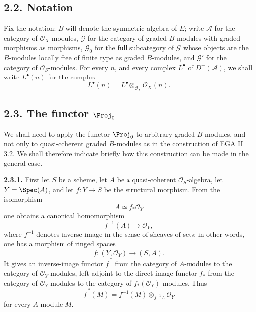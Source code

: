 \subsection*{2.2. Notation}
Fix the notation: \(B\) will denote the symmetric algebra of \(E\); write \(\mathcal A\) for the category of \(\mathcal O_X\)-modules, \(\mathcal G\) for the category of graded \(B\)-modules with graded morphisms as morphisms, \(\mathcal G_0\) for the full subcategory of \(\mathcal G\) whose objects are the \(B\)-modules locally free of finite type as graded \(B\)-modules, and \(\mathcal G'\) for the category of \(\mathcal O_S\)-modules. For every \(n\), and every complex \(L^\bullet\) of \(D^+(\mathcal A)\), we shall write \(L^\bullet(n)\) for the complex
\[
  L^\bullet(n)=L^\bullet\otimes_{\mathcal O_X}\mathcal O_X(n).
\]

\subsection*{2.3. The functor \(\Proj_0\)}
We shall need to apply the functor \(\Proj_0\) to arbitrary graded \(B\)-modules, and not only to quasi-coherent graded \(B\)-modules as in the construction of EGA II 3.2. We shall therefore indicate briefly how this construction can be made in the general case.

\textbf{2.3.1.} First let \(S\) be a scheme, let \(A\) be a quasi-coherent \(\mathcal O_S\)-algebra, let \(Y=\Spec(A)\), and let \(f:Y\to S\) be the structural morphism. From the isomorphism
\[
  A\simeq f_*\mathcal O_Y
\]
one obtains a canonical homomorphism
\begin{equation}\tag{2.3.1.1}
  f^{-1}(A)\longrightarrow \mathcal O_Y,
\end{equation}
where \(f^{-1}\) denotes inverse image in the sense of sheaves of sets; in other words, one has a morphism of ringed spaces
\begin{equation}\tag{2.3.1.2}
  \bar f:(Y,\mathcal O_Y)\longrightarrow (S,A).
\end{equation}
It gives an inverse-image functor \(\bar f^{\,*}\) from the category of \(A\)-modules to the category of \(\mathcal O_Y\)-modules, left adjoint to the direct-image functor \(\bar f_*\) from the category of \(\mathcal O_Y\)-modules to the category of \(f_*(\mathcal O_Y)\)-modules. Thus
\begin{equation}\tag{2.3.1.3}
  \bar f^{\,*}(M)=f^{-1}(M)\otimes_{f^{-1}A}\mathcal O_Y
\end{equation}
for every \(A\)-module \(M\).

